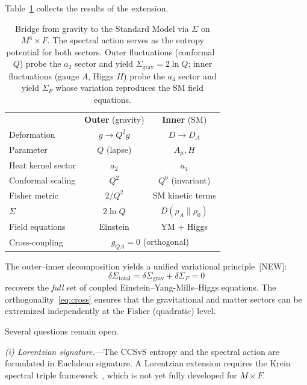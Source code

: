 Table~\ref{tab:bridge} collects the
results of the extension.

\begin{table}[t]
\centering
\caption{Bridge from gravity to the Standard
Model via $\Sigma$ on $M^4 \times F$.
The spectral action serves as the entropy
potential for both sectors.
Outer fluctuations (conformal~$Q$) probe
the $a_2$ sector and yield
$\Sigma_{\mathrm{grav}} = 2\ln Q$;
inner fluctuations (gauge $A$, Higgs $H$)
probe the $a_4$ sector and yield
$\Sigma_F$ whose variation reproduces the
SM field equations.}
\label{tab:bridge}
\begin{ruledtabular}
\begin{tabular}{lcc}
 & \textbf{Outer} (gravity)
 & \textbf{Inner} (SM) \\
\colrule
Deformation
 & $g \to Q^2 g$
 & $D \to D_A$ \\
Parameter
 & $Q$ (lapse)
 & $A_\mu, H$ \\
Heat kernel sector
 & $a_2$
 & $a_4$ \\
Conformal scaling
 & $Q^2$
 & $Q^0$ (invariant) \\
Fisher metric
 & $2/Q^2$
 & SM kinetic terms \\
$\Sigma$
 & $2\ln Q$
 & $D(\rho_A \| \rho_0)$ \\
Field equations
 & Einstein
 & YM + Higgs \\
Cross-coupling
 & \multicolumn{2}{c}{$g_{QA} = 0$ (orthogonal)} \\
\end{tabular}
\end{ruledtabular}
\end{table}

The outer--inner decomposition yields a
unified variational principle~[NEW]:
\begin{equation}\label{eq:master}
  \delta\Sigma_{\mathrm{total}}
  = \delta\Sigma_{\mathrm{grav}}
  + \delta\Sigma_F
  = 0
\end{equation}
recovers the \emph{full} set of
coupled Einstein--Yang-Mills--Higgs
equations.
The orthogonality~\eqref{eq:cross}
ensures that the gravitational and
matter sectors can be extremized
independently at the Fisher (quadratic)
level.

Several questions remain open.

\emph{(i) Lorentzian signature.}---The
CCSvS entropy and the spectral action
are formulated in Euclidean signature.
A Lorentzian extension requires
the Krein spectral triple
framework~\cite{vandenDungen2016,Besnard2017},
which is not yet fully developed
for $M \times F$.

